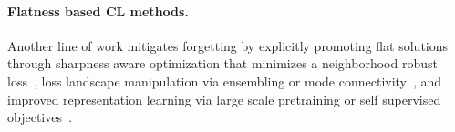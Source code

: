 \documentclass{article}
\begin{document}
\paragraph{Flatness based CL methods.}
Another line of work mitigates forgetting by explicitly promoting flat solutions~\citep{NEURIPS2020_518a38cc,JMLRAnEmpiricalInvestigatio,liRevisitingCatastrophicForgetting2024} through sharpness aware optimization that minimizes a neighborhood robust loss~\cite{pmlr-v151-bisla22a,Zhang_GAM,NEURIPS2024_C-Flat,yangRevisitingFlatnessAwareOptimization2025,chen2026sharpnessflatnessdecompositionframework}, loss landscape manipulation via ensembling or mode connectivity~\cite{izmailov2019averagingweightsleadswider,mirzadeh2020linearmodeconnectivitymultitask}, and improved representation learning via large scale pretraining or self supervised objectives~\cite{hu2022doesselfsupervisedpretrainingperform,ramasesh2022effect}. 


\end{document}
